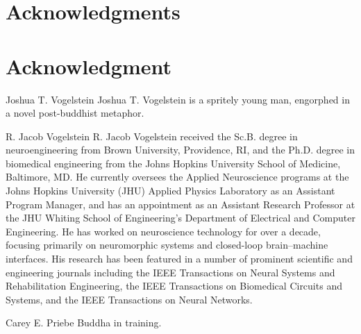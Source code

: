 \documentclass[10pt,journal,cspaper,compsoc]{IEEEtran}
\begin{document}
\ifCLASSOPTIONcompsoc
  \section*{Acknowledgments}
\else
  \section*{Acknowledgment}
\fi


\ifCLASSOPTIONcaptionsoff
  \newpage
\fi





\begin{IEEEbiography}{Joshua T. Vogelstein}
Joshua T. Vogelstein is a spritely young man, engorphed in a novel post-buddhist metaphor.

\end{IEEEbiography}



\begin{IEEEbiographynophoto}{R. Jacob Vogelstein}
R. Jacob Vogelstein received the Sc.B. degree in neuroengineering from Brown University, Providence, RI, and the Ph.D. degree in biomedical engineering from the Johns Hopkins University School of Medicine, Baltimore, MD.  He currently oversees the Applied Neuroscience programs at the Johns Hopkins University (JHU) Applied Physics Laboratory as an Assistant Program Manager, and has an appointment as an Assistant Research Professor at the JHU Whiting School of Engineering’s Department of Electrical and Computer Engineering. He has worked on neuroscience technology for over a decade, focusing primarily on neuromorphic systems and closed-loop brain–machine interfaces. His research has been featured in a number of prominent scientific and engineering journals including the IEEE Transactions on Neural Systems and Rehabilitation Engineering, the IEEE Transactions on Biomedical Circuits and Systems, and the IEEE Transactions on Neural Networks.  
\end{IEEEbiographynophoto}

\begin{IEEEbiography}{Carey E. Priebe}
Buddha in training.
\end{IEEEbiography}

\end{document}

